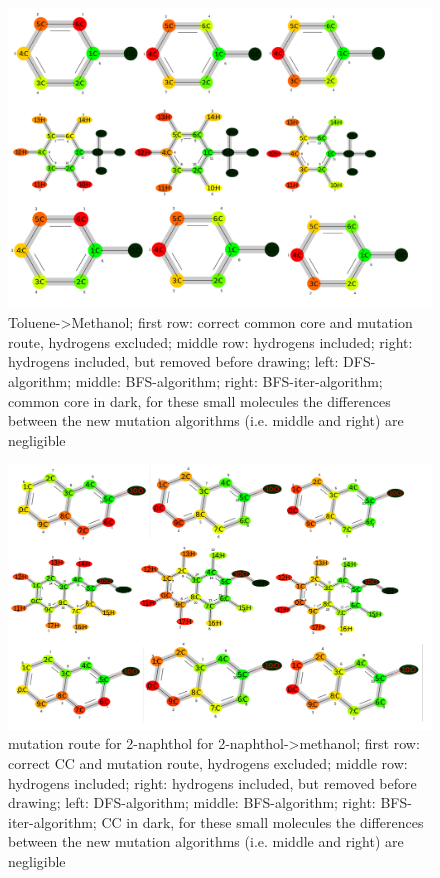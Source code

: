 \begin{figure}[H]
	
	\includegraphics[scale=0.75]{toluene_set2}\caption{Toluene->Methanol; first row: correct common core and mutation route, hydrogens excluded; middle row: hydrogens included; right: hydrogens included, but removed before drawing; left: DFS-algorithm; middle: BFS-algorithm; right: BFS-iter-algorithm; common core in dark, for these small molecules the differences between the new mutation algorithms (i.e. middle and right) are negligible}
	
\end{figure}


\begin{figure}[H]
	
	\includegraphics[scale=0.75]{2naphthol_set2}\caption{mutation route for 2-naphthol for 2-naphthol->methanol; first row: correct CC and mutation route, hydrogens excluded; middle row: hydrogens included; right: hydrogens included, but removed before drawing; left: DFS-algorithm; middle: BFS-algorithm; right: BFS-iter-algorithm; CC in dark, for these small molecules the differences between the new mutation algorithms (i.e. middle and right) are negligible}
	
\end{figure}

